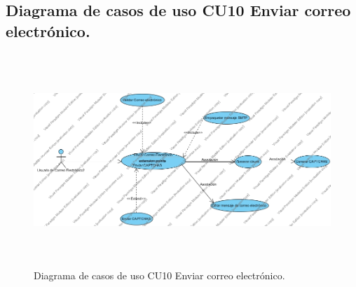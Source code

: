 \subsection{Diagrama de casos de uso CU10 Enviar correo electrónico.}
\begin{figure}[H]
	\includegraphics[width=1\linewidth, height=8cm]{./images/casodeuso10.jpg}
	\caption{Diagrama de casos de uso CU10 Enviar correo electrónico.}
	\label{fig:4-11-1}
\end{figure}
